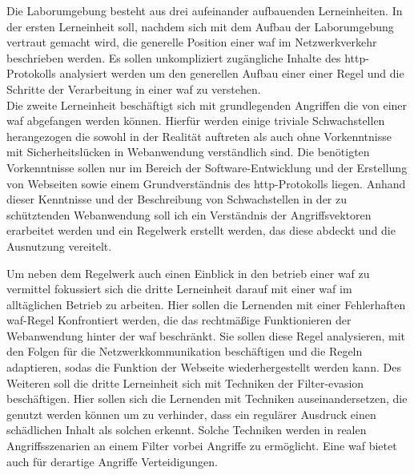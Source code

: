 Die Laborumgebung besteht aus drei aufeinander aufbauenden Lerneinheiten.
In der ersten Lerneinheit soll, nachdem sich mit dem Aufbau der Laborumgebung vertraut gemacht wird, die generelle Position einer \ac{waf} im Netzwerkverkehr beschrieben werden.
Es sollen unkompliziert zugängliche Inhalte des \ac{http}-Protokolls analysiert werden um den generellen Aufbau einer einer Regel und die Schritte der Verarbeitung in einer \ac{waf} zu verstehen.\\

Die zweite Lerneinheit beschäftigt sich mit grundlegenden Angriffen die von einer \ac{waf} abgefangen werden können.
Hierfür werden einige triviale Schwachstellen herangezogen die sowohl in der Realität auftreten als auch ohne Vorkenntnisse mit Sicherheitslücken in Webanwendung verständlich sind.
Die benötigten Vorkenntnisse sollen nur im Bereich der Software-Entwicklung und der Erstellung von Webseiten sowie einem Grundverständnis des \ac{http}-Protokolls liegen.
Anhand dieser Kenntnisse und der Beschreibung von Schwachstellen in der zu schütztenden Webanwendung soll ich ein Verständnis der Angriffsvektoren erarbeitet werden und ein Regelwerk erstellt werden, das diese abdeckt und die Ausnutzung vereitelt.

Um neben dem Regelwerk auch einen Einblick in den betrieb einer \ac{waf} zu vermittel fokussiert sich die dritte Lerneinheit darauf mit einer \ac{waf} im alltäglichen Betrieb zu arbeiten.
Hier sollen die Lernenden mit einer Fehlerhaften \ac{waf}-Regel Konfrontiert werden, die das rechtmäßige Funktionieren der Webanwendung  hinter der \ac{waf} beschränkt.
Sie sollen diese Regel analysieren, mit den Folgen für die Netzwerkkommunikation beschäftigen und die Regeln adaptieren, sodas die Funktion der Webseite wiederhergestellt werden kann.
Des Weiteren soll die dritte Lerneinheit sich mit Techniken der Filter-evasion beschäftigen.
Hier sollen sich die Lernenden mit Techniken auseinandersetzen, die genutzt werden können um zu verhinder, dass ein regulärer Ausdruck einen schädlichen Inhalt als solchen erkennt.
Solche Techniken werden in realen Angriffsszenarien an einem Filter vorbei Angriffe zu ermöglicht.
Eine \ac{waf} bietet auch für derartige Angriffe Verteidigungen.